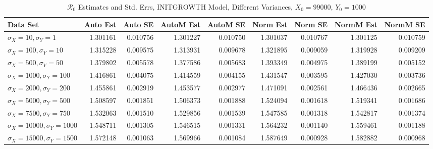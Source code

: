 \documentclass[12pt]{article}
\newcommand{\rr}{\ensuremath{\mathcal{R}_0}}
\begin{document}
\begin{table}[H]
	
	\caption{$\rr$ Estimates and Std. Errs, INITGROWTH Model, 
		Different Variances, $X_0 = 99000$, $Y_0 = 1000$}
	\begin{footnotesize}
		\hskip -1.7cm
		\begin{tabular}{l|r|r|r|r|r|r|r|r}
			\hline
			Data Set & Auto Est & Auto SE & AutoM Est & AutoM SE & Norm Est & Norm SE & NormM Est & NormM SE\\
			\hline
			$\sigma_X = 10, \sigma_Y = 1$ & 1.301161 & 0.010756 & 1.301227 & 0.010750 & 1.301037 & 0.010767 & 1.301125 & 0.010759\\
			\hline
			$\sigma_X = 100, \sigma_Y = 10$ & 1.315228 & 0.009575 & 1.313931 & 0.009678 & 1.321895 & 0.009059 & 1.319928 & 0.009209\\
			\hline
			$\sigma_X = 500, \sigma_Y = 50$ & 1.379802 & 0.005578 & 1.377586 & 0.005683 & 1.393349 & 0.004975 & 1.389199 & 0.005152\\
			\hline
			$\sigma_X = 1000, \sigma_Y = 100$ & 1.416861 & 0.004075 & 1.414559 & 0.004155 & 1.431547 & 0.003595 & 1.427030 & 0.003736\\
			\hline
			$\sigma_X = 2000, \sigma_Y = 200$ & 1.455861 & 0.002919 & 1.453577 & 0.002977 & 1.471091 & 0.002561 & 1.466436 & 0.002665\\
			\hline
			$\sigma_X = 5000, \sigma_Y = 500$ & 1.508597 & 0.001851 & 1.506373 & 0.001888 & 1.524094 & 0.001618 & 1.519341 & 0.001686\\
			\hline
			$\sigma_X = 7500, \sigma_Y = 750$ & 1.532063 & 0.001510 & 1.529856 & 0.001539 & 1.547585 & 0.001318 & 1.542817 & 0.001374\\
			\hline
			$\sigma_X = 10000, \sigma_Y = 1000$ & 1.548711 & 0.001305 & 1.546515 & 0.001331 & 1.564232 & 0.001140 & 1.559461 & 0.001188\\
			\hline
			$\sigma_X = 15000, \sigma_Y = 1500$ & 1.572148 & 0.001063 & 1.569966 & 0.001084 & 1.587649 & 0.000928 & 1.582882 & 0.000968\\
			\hline
		\end{tabular}
	\end{footnotesize}
\end{table}
\end{document}
